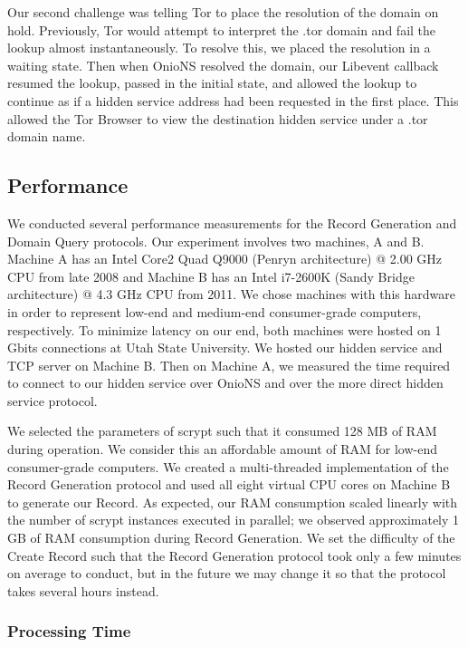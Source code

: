 Our second challenge was telling Tor to place the resolution of the domain on hold. Previously, Tor would attempt to interpret the .tor domain and fail the lookup almost instantaneously. To resolve this, we placed the resolution in a waiting state. Then when OnioNS resolved the domain, our Libevent callback resumed the lookup, passed in the initial state, and allowed the lookup to continue as if a hidden service address had been requested in the first place. This allowed the Tor Browser to view the destination hidden service under a .tor domain name.

\subsection{Performance}

We conducted several performance measurements for the Record Generation and Domain Query protocols. Our experiment involves two machines, A and B. Machine A has an Intel Core2 Quad Q9000 (Penryn architecture) @ 2.00 GHz CPU from late 2008 and Machine B has an Intel i7-2600K (Sandy Bridge architecture) @ 4.3 GHz CPU from 2011. We chose machines with this hardware in order to represent low-end and medium-end consumer-grade computers, respectively. To minimize latency on our end, both machines were hosted on 1 Gbits connections at Utah State University. We hosted our hidden service and TCP server on Machine B. Then on Machine A, we measured the time required to connect to our hidden service over OnioNS and over the more direct hidden service protocol.

We selected the parameters of scrypt such that it consumed 128 MB of RAM during operation. We consider this an affordable amount of RAM for low-end consumer-grade computers. We created a multi-threaded implementation of the Record Generation protocol and used all eight virtual CPU cores on Machine B to generate our Record. As expected, our RAM consumption scaled linearly with the number of scrypt instances executed in parallel; we observed approximately 1 GB of RAM consumption during Record Generation. We set the difficulty of the Create Record such that the Record Generation protocol took only a few minutes on average to conduct, but in the future we may change it so that the protocol takes several hours instead.

\subsubsection{Processing Time}

